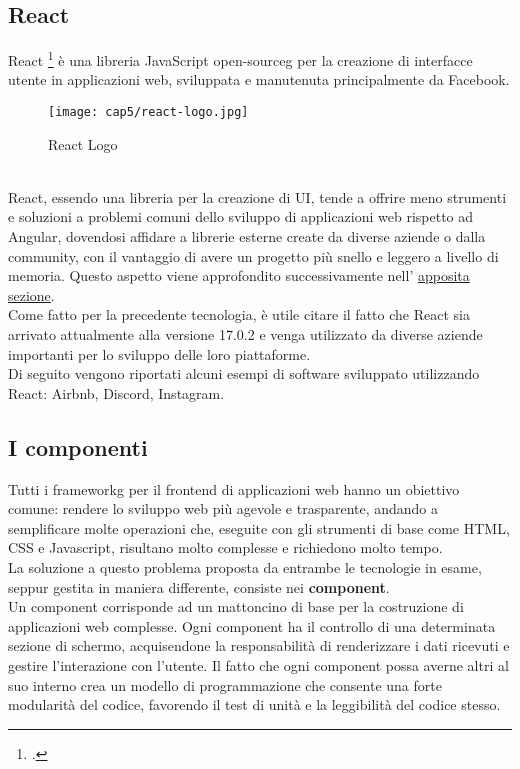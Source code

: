 \subsection{React}
React \footcite{site:react} è una libreria JavaScript \gls{open-sourceg} per la creazione di interfacce utente in applicazioni web, sviluppata e manutenuta principalmente da Facebook. \\
\begin{figure}[!h] 
    \centering 
    \texttt{[image: cap5/react-logo.jpg]} 
    \caption{React Logo}
\end{figure} \\
React, essendo una libreria per la creazione di UI, tende a offrire meno strumenti e soluzioni a problemi comuni dello sviluppo di applicazioni web rispetto ad Angular, dovendosi affidare a librerie esterne create da diverse aziende o dalla community, con il vantaggio di avere un progetto più snello e leggero a livello di memoria. Questo aspetto viene approfondito successivamente nell' \hyperref[sec:performance]{apposita sezione}. \\
Come fatto per la precedente tecnologia, è utile citare il fatto che React sia arrivato attualmente alla versione 17.0.2 e venga utilizzato da diverse aziende importanti per lo sviluppo delle loro piattaforme. \\
Di seguito vengono riportati alcuni esempi di software sviluppato utilizzando React: Airbnb, Discord, Instagram.

\subsection{I componenti}
Tutti i \gls{frameworkg} per il frontend di applicazioni web hanno un obiettivo comune: rendere lo sviluppo web più agevole e trasparente, andando a semplificare molte operazioni che, eseguite con gli strumenti di base come HTML, CSS e Javascript, risultano molto complesse e richiedono molto tempo. \\
La soluzione a questo problema proposta da entrambe le tecnologie in esame, seppur gestita in maniera differente, consiste nei \textbf{component}. \\
Un component corrisponde ad un mattoncino di base per la costruzione di applicazioni web complesse. Ogni component ha il controllo di una determinata sezione di schermo, acquisendone la responsabilità di renderizzare i dati ricevuti e gestire l'interazione con l'utente. Il fatto che ogni component possa averne altri al suo interno crea un modello di programmazione che consente una forte modularità del codice, favorendo il test di unità e la leggibilità del codice stesso.

